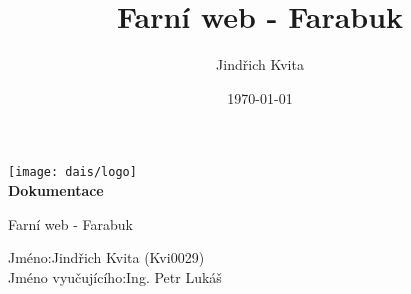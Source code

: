 \documentclass[12pt]{article}
\begin{document}
	\begin{titlepage}
		\begin{center}
			\vspace*{1cm}
			\texttt{[image: dais/logo]}\\
			\vspace*{1cm}
			\huge\textbf{Dokumentace}
			\Large
			
			\vspace{0.5cm}
			Farní web - Farabuk
			
			\vspace{1.5cm}
		\end{center}
			\vspace{6cm}
			\normalsize
			Jméno:\quad \quad \quad \quad \quad \quad Jindřich Kvita (Kvi0029)\\
			Jméno vyučujícího:\quad	Ing. Petr Lukáš
			\title{Farní web - Farabuk}
			\author{Jindřich Kvita}
			\date{\today }
			
			\vfill
		
	\end{titlepage}
\end{document}

